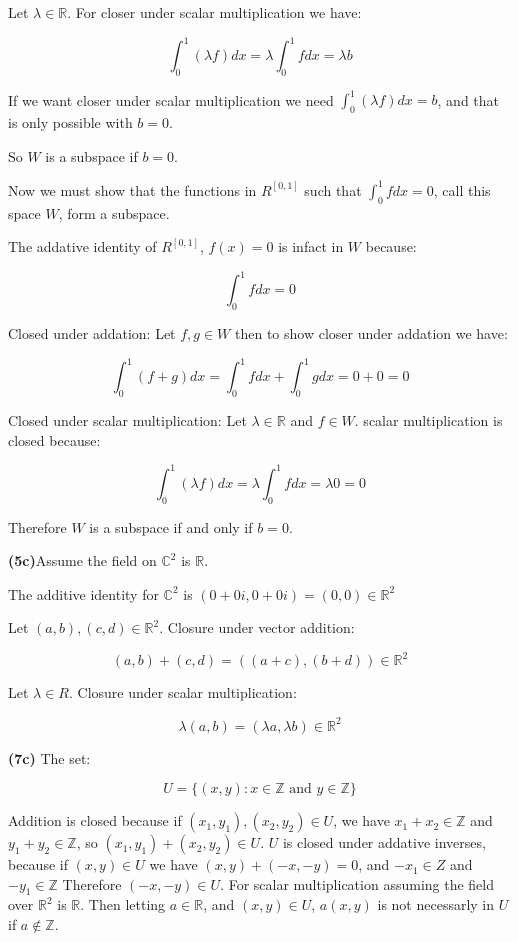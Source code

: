 \documentclass{article}
\begin{document}
\newpage

\noindent Let $\lambda \in \mathbb{R}$. For closer under scalar multiplication we have:

$$\int_0^1 (\lambda f) dx = \lambda \int_0^1 fdx = \lambda b$$

\noindent If we want closer under scalar multiplication we need $\int_0^1 (\lambda f) dx = b$, and that is only possible with $b=0$.

\noindent So $W$ is a subspace if $b = 0$.

\noindent Now we must show that the functions in $R^{[0,1]}$ such that $\int_0^1 f dx = 0$, call this space $W$, form a subspace.


\noindent The addative identity of $R^{[0,1]}$, $f(x) = 0$ is infact in $W$ because:

$$\int_0^1 f  dx = 0$$

\noindent Closed under addation: Let $f,g \in W$ then to show closer under addation we have:

$$\int_0^1 (f + g) dx = \int_0^1 f dx + \int_0^1 g dx = 0 + 0 = 0$$

\noindent Closed under scalar multiplication: Let $\lambda \in \mathbb{R}$ and $f \in W$. scalar multiplication is closed because:

$$\int_0^1 (\lambda f) dx = \lambda \int_0^1 fdx = \lambda 0 = 0$$

\noindent Therefore $W$ is a subspace if and only if $b = 0$.


\vspace{9mm}

\noindent\textbf{(5c)}Assume the field on $\mathbb{C}^2$ is $\mathbb{R}$.

\noindent The additive identity for $\mathbb{C}^2$ is $(0 + 0i, 0 + 0i) = (0, 0) \in \mathbb{R}^2$

\noindent Let $(a,b), (c,d) \in \mathbb{R}^2$. Closure under vector addition:

$$(a,b) + (c,d) = ((a+c), (b+d)) \in \mathbb{R}^2$$


\noindent Let $\lambda \in R$. Closure under scalar multiplication:

$$ \lambda (a,b) = (\lambda a, \lambda b) \in \mathbb{R}^2$$


\vspace{3mm}

\noindent\textbf{(7c)} The set:

$$U = \{(x,y) : x \in \mathbb{Z} \text{ and } y \in \mathbb{Z} \}$$

\noindent Addition is closed because if $(x_1, y_1), (x_2, y_2) \in U$, we have $x_1 + x_2 \in \mathbb{Z}$ and $y_1 + y_2 \in \mathbb{Z}$, so $(x_1, y_1) + (x_2, y_2) \in U$. $U$ is closed  under addative inverses, because if $(x,y) \in U$ we have $(x,y) + (-x, -y) = 0$, and $-x_1 \in Z$ and $-y_1 \in \mathbb{Z}$ Therefore $(-x,-y) \in U$. For scalar multiplication assuming the field over $\mathbb{R}^2$ is $\mathbb{R}$. Then letting $a \in \mathbb{R}$, and $(x,y) \in U$,  $a(x,y)$ is not necessarly in $U$ if $a \notin \mathbb{Z}$.
\end{document}
